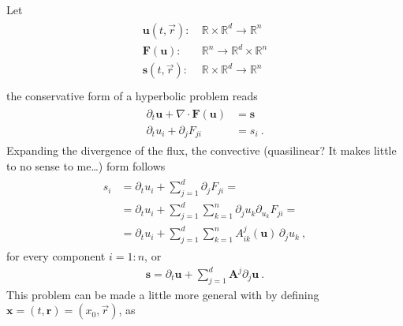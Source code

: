 \documentclass[letterpaper,10pt,english]{jupyterBook}
\begin{document}
\sphinxAtStartPar
Let
\begin{equation*}
\begin{split}\begin{aligned}
  \mathbf{u}(t,    \vec{r}): & \ \mathbb{R} \times \mathbb{R}^d \rightarrow \mathbb{R}^n \\
  \mathbf{F}(   \mathbf{u}): & \ \mathbb{R}^{n} \rightarrow \mathbb{R}^{d} \times \mathbb{R}^n \\
  \mathbf{s}(t,    \vec{r}): & \ \mathbb{R} \times \mathbb{R}^d \rightarrow \mathbb{R}^n \\
\end{aligned}\end{split}
\end{equation*}
\sphinxAtStartPar
the conservative form of a hyperbolic problem reads
\begin{equation*}
\begin{split}\begin{aligned}
  \partial_t \mathbf{u} + \nabla \cdot \mathbf{F}(\mathbf{u}) & = \mathbf{s} \\
  \partial_t u_i + \partial_j F_{ji} & = s_i \ .
\end{aligned}\end{split}
\end{equation*}
\sphinxAtStartPar
Expanding the divergence of the flux, the convective (quasi\sphinxhyphen{}linear? It makes little to no sense to me…) form follows
\begin{equation*}
\begin{split}\begin{aligned}
  s_i 
  & = \partial_t u_i + \sum_{j=1}^{d} \partial_j F_{ji} = \\
  & = \partial_t u_i + \sum_{j=1}^{d} \sum_{k=1}^{n} \partial_j u_k \partial_{u_k} F_{ji} = \\
  & = \partial_t u_i + \sum_{j=1}^{d} \sum_{k=1}^{n} A^{j}_{ik}(\mathbf{u}) \, \partial_j u_k  \ ,
\end{aligned}\end{split}
\end{equation*}
\sphinxAtStartPar
for every component \(i = 1:n\), or
\begin{equation*}
\begin{split}\mathbf{s} = \partial_t \mathbf{u} + \sum_{j=1}^{d} \mathbf{A}^j \partial_j \mathbf{u} \ .\end{split}
\end{equation*}
\sphinxAtStartPar
This problem can be made a little more general with by defining \(\mathbf{x} = (t, \mathbf{r}) = ( x_0, \vec{r} )\), as
\end{document}

